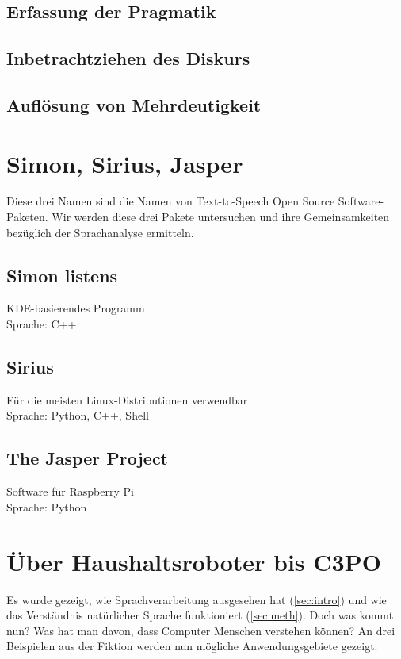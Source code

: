 \documentclass[12pt,twoside]{article}
\theoremstyle{plain}
\theoremstyle{definition}
\theoremstyle{remark}
\begin{document}
	\subsection{Erfassung der Pragmatik}
	\label{ssec:prag}
	\subsection{Inbetrachtziehen des Diskurs}
	\label{ssec:disc}
	\subsection{Auflösung von Mehrdeutigkeit}
	\label{ssec:ambi}

\section{Simon, Sirius, Jasper}
Diese drei Namen sind die Namen von Text-to-Speech Open Source Software-Paketen.
Wir werden diese drei Pakete untersuchen und ihre Gemeinsamkeiten bezüglich der Sprachanalyse ermitteln.
\label{sec:software}
	\subsection{Simon listens}
	\label{ssec:simon}
	KDE-basierendes Programm\\
	Sprache: C++
	\subsection{Sirius}
	\label{ssec:sirius}
	Für die meisten Linux-Distributionen verwendbar\\
	Sprache: Python, C++, Shell
	\subsection{The Jasper Project}
	\label{ssec:jasper}
	Software für Raspberry Pi\\
	Sprache: Python

\newpage
\section{Über Haushaltsroboter bis C3PO}
\label{sec:ausb}
Es wurde gezeigt, wie Sprachverarbeitung ausgesehen hat (\ref{sec:intro}) und wie das Verständnis natürlicher Sprache funktioniert (\ref{sec:meth}).
Doch was kommt nun?
Was hat man davon, dass Computer Menschen verstehen können?
An drei Beispielen aus der Fiktion werden nun mögliche Anwendungsgebiete gezeigt.
\end{document}
